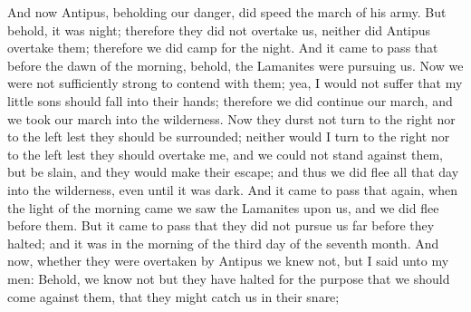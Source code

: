 And now Antipus, beholding our danger, did speed the march of his army. But behold, it was night; therefore they did not overtake us, neither did Antipus overtake them; therefore we did camp for the night.
\bverse \iffalse And it came to pass that before the dawn of the morning, behold, the Lamanites were pursuing us. Now we were not sufficiently strong to contend with them; yea, I would not suffer that my little sons should fall into their hands; therefore we did continue our march, and we took our march into the wilderness. \fi
And it came to pass that before the dawn of the morning, behold, the Lamanites were pursuing us. Now we were not sufficiently strong to contend with them; yea, I would not suffer that my little sons should fall into their hands; therefore we did continue our march, and we took our march into the wilderness.
\bverse \iffalse Now they durst not turn to the right nor to the left lest they should be surrounded; neither would I turn to the right nor to the left lest they should overtake me, and we could not stand against them, but be slain, and they would make their escape; and thus we did flee all that day into the wilderness, even until it was dark. \fi
Now they durst not turn to the right nor to the left lest they should be surrounded; neither would I turn to the right nor to the left lest they should overtake me, and we could not stand against them, but be slain, and they would make their escape; and thus we did flee all that day into the wilderness, even until it was dark.
\bverse \iffalse And it came to pass that again, when the light of the morning came we saw the Lamanites upon us, and we did flee before them. \fi
And it came to pass that again, when the light of the morning came we saw the Lamanites upon us, and we did flee before them.
\bverse \iffalse But it came to pass that they did not pursue us far before they halted; and it was in the morning of the third day of the seventh month. \fi
But it came to pass that they did not pursue us far before they halted; and it was in the morning of the third day of the seventh month.
\bverse \iffalse And now, whether they were overtaken by Antipus we knew not, but I said unto my men: Behold, we know not but they have halted for the purpose that we should come against them, that they might catch us in their snare; \fi
And now, whether they were overtaken by Antipus we knew not, but I said unto my men: Behold, we know not but they have halted for the purpose that we should come against them, that they might catch us in their snare;
